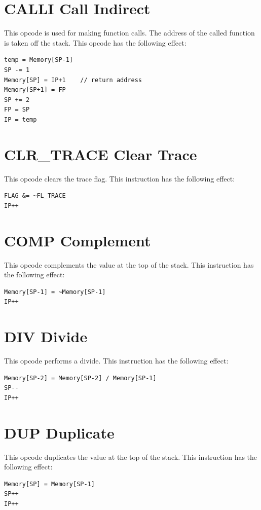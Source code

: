 \documentclass[11pt,a4paper,oneside]{book}
\begin{document}
\pagebreak
\section[CALLI]{\texorpdfstring{CALLI \hfill Call Indirect}{CALLI -- Call Indirect}}
This opcode is used for making function calls. The address of the called function is taken off the stack. This opcode has the following effect:
\begin{verbatim}
temp = Memory[SP-1]
SP -= 1
Memory[SP] = IP+1    // return address
Memory[SP+1] = FP
SP += 2
FP = SP
IP = temp
\end{verbatim}

\pagebreak
\section[CLR\_TRACE]{\texorpdfstring{CLR\_TRACE \hfill Clear Trace}{CLR\_TRACE -- Clear Trace}}
This opcode clears the trace flag. This instruction has the following effect:
\begin{verbatim}
FLAG &= ~FL_TRACE
IP++
\end{verbatim}

\pagebreak
\section[COMP]{\texorpdfstring{COMP \hfill Complement}{COMP -- Complement}}
This opcode complements the value at the top of the stack. This instruction has the following effect:
\begin{verbatim}
Memory[SP-1] = ~Memory[SP-1]
IP++
\end{verbatim}

\pagebreak
\section[DIV]{\texorpdfstring{DIV \hfill Divide}{DIV -- Divide}}
This opcode performs a divide. This instruction has the following effect:
\begin{verbatim}
Memory[SP-2] = Memory[SP-2] / Memory[SP-1]
SP--
IP++
\end{verbatim}

\pagebreak
\section[DUP]{\texorpdfstring{DUP \hfill Duplicate}{DUP -- Duplicate}}
This opcode duplicates the value at the top of the stack. This instruction has the following effect:
\begin{verbatim}
Memory[SP] = Memory[SP-1]
SP++
IP++
\end{verbatim}
\end{document}
